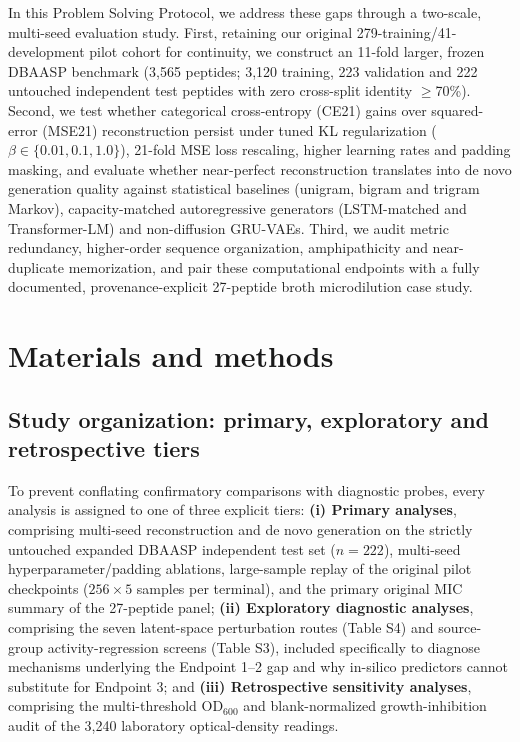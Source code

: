 \documentclass[unnumsec,webpdf,contemporary,large]{oup-authoring-template}
\newcommand{\rev}[1]{#1}
\begin{document}
\rev{In this Problem Solving Protocol, we address these gaps through a two-scale, multi-seed evaluation study. First, retaining our original 279-training/41-development pilot cohort for continuity, we construct an 11-fold larger, frozen DBAASP benchmark (3,565 peptides; 3,120 training, 223 validation and 222 untouched independent test peptides with zero cross-split identity $\geq$70\%). Second, we test whether categorical cross-entropy (CE21) gains over squared-error (MSE21) reconstruction persist under tuned KL regularization ($\beta\in\{0.01,0.1,1.0\}$), 21-fold MSE loss rescaling, higher learning rates and padding masking, and evaluate whether near-perfect reconstruction translates into de novo generation quality against statistical baselines (unigram, bigram and trigram Markov), capacity-matched autoregressive generators (LSTM-matched and Transformer-LM) and non-diffusion GRU-VAEs. Third, we audit metric redundancy, higher-order sequence organization, amphipathicity and near-duplicate memorization, and pair these computational endpoints with a fully documented, provenance-explicit 27-peptide broth microdilution case study.}

\section{Materials and methods}

\rev{\subsection{Study organization: primary, exploratory and retrospective tiers}}

\rev{To prevent conflating confirmatory comparisons with diagnostic probes, every analysis is assigned to one of three explicit tiers: \textbf{(i) Primary analyses}, comprising multi-seed reconstruction and de novo generation on the strictly untouched expanded DBAASP independent test set ($n=222$), multi-seed hyperparameter/padding ablations, large-sample replay of the original pilot checkpoints ($256\times 5$ samples per terminal), and the primary original MIC summary of the 27-peptide panel; \textbf{(ii) Exploratory diagnostic analyses}, comprising the seven latent-space perturbation routes (Table S4) and source-group activity-regression screens (Table S3), included specifically to diagnose mechanisms underlying the Endpoint 1--2 gap and why in-silico predictors cannot substitute for Endpoint 3; and \textbf{(iii) Retrospective sensitivity analyses}, comprising the multi-threshold OD$_{600}$ and blank-normalized growth-inhibition audit of the 3,240 laboratory optical-density readings.}
\end{document}

